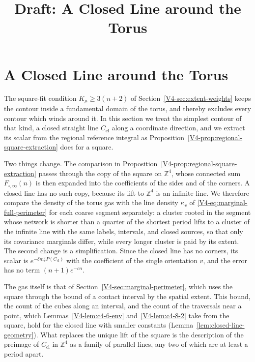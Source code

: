 \documentclass[11pt]{article}
\title{Draft: A Closed Line around the Torus}
\author{}
\date{}
\numberwithin{equation}{section}
\theoremstyle{remark}
\theoremstyle{plain}
\begin{document}
\maketitle

\section{A Closed Line around the Torus}\label{sec:closed-line}

The square-fit condition $K_{\mu}\geqslant 3(n+2)$ of Section~\ref{V4-sec:extent-weights} keeps the contour inside a fundamental domain of the torus, and thereby excludes every contour which winds around it. In this section we treat the simplest contour of that kind, a closed straight line $C_{\mathrm{cl}}$ along a coordinate direction, and we extract its scalar from the regional reference integral as Proposition~\ref{V4-prop:regional-square-extraction} does for a square.

Two things change. The comparison in Proposition~\ref{V4-prop:regional-square-extraction} passes through the copy of the square on $\mathbb Z^4$, whose connected sum $F_{\square,\infty}(n)$ is then expanded into the coefficients of the sides and of the corners. A closed line has no such copy, because its lift to $\mathbb Z^4$ is an infinite line. We therefore compare the density of the torus gas with the line density $\kappa_v$ of \eqref{V4-eq:marginal-full-perimeter} for each coarse segment separately: a cluster rooted in the segment whose network is shorter than a quarter of the shortest period lifts to a cluster of the infinite line with the same labels, intervals, and closed sources, so that only its covariance marginals differ, while every longer cluster is paid by its extent. The second change is a simplification. Since the closed line has no corners, its scalar is $e^{-\delta m_v^{\sigma}P(C_{\mathrm{cl}})}$ with the coefficient of the single orientation $v$, and the error has no term $(n+1)e^{-cn}$.

The gas itself is that of Section~\ref{V4-sec:marginal-perimeter}, which uses the square through the bound of a contact interval by the spatial extent. This bound, the count of the cubes along an interval, and the count of the traversals near a point, which Lemmas~\ref{V4-lem:c4-6-env} and~\ref{V4-lem:c4-8-2} take from the square, hold for the closed line with smaller constants (Lemma~\ref{lem:closed-line-geometry}). What replaces the unique lift of the square is the description of the preimage of $C_{\mathrm{cl}}$ in $\mathbb Z^4$ as a family of parallel lines, any two of which are at least a period apart.
\end{document}
